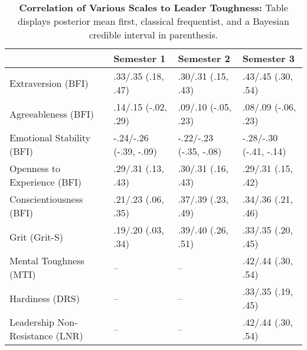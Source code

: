 \begin{table}[ht]
\centering
\begin{tabular}{llll}
  \hline
 & Semester 1 & Semester 2 & Semester 3 \\ 
  \hline
Extraversion (BFI) & .33/.35 (.18, .47) & .30/.31 (.15, .43) & .43/.45 (.30, .54) \\ 
  Agreeableness (BFI) & .14/.15 (-.02, .29) & .09/.10 (-.05, .23) & .08/.09 (-.06, .23) \\ 
  Emotional Stability (BFI) & -.24/-.26 (-.39, -.09) & -.22/-.23 (-.35, -.08) & -.28/-.30 (-.41, -.14) \\ 
  Openness to Experience (BFI) & .29/.31 (.13, .43) & .30/.31 (.16, .43) & .29/.31 (.15, .42) \\ 
  Conscientiousness (BFI) & .21/.23 (.06, .35) & .37/.39 (.23, .49) & .34/.36 (.21, .46) \\ 
  Grit (Grit-S) & .19/.20 (.03, .34) & .39/.40 (.26, .51) & .33/.35 (.20, .45) \\ 
  Mental Toughness (MTI) & -- & -- & .42/.44 (.30, .54) \\ 
  Hardiness (DRS) & -- & -- & .33/.35 (.19, .45) \\ 
  Leadership Non-Resistance (LNR) & -- & -- & .42/.44 (.30, .54) \\ 
   \hline
\end{tabular}
\caption{\textbf{Correlation of Various Scales to Leader Toughness:} Table displays posterior mean first, classical frequentist, and a Bayesian credible interval in parenthesis.} 
\label{tab:pers_corr}
\end{table}
